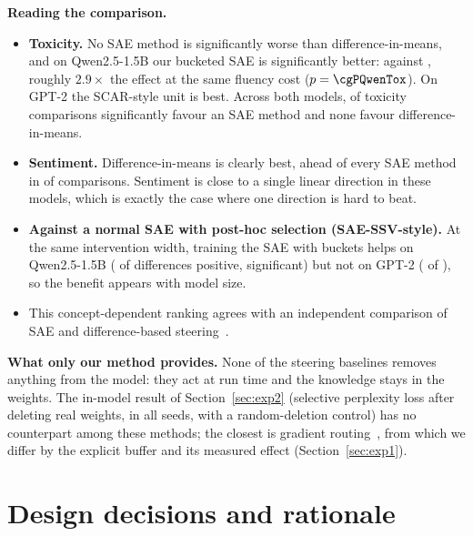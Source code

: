 \documentclass[11pt,a4paper]{article}
\theoremstyle{definition}
\begin{document}
\textbf{Reading the comparison.}
\begin{itemize}
  \item \textbf{Toxicity.} No SAE method is significantly worse than difference-in-means, and on
  Qwen2.5-1.5B our bucketed SAE is significantly better: \cgQwenTox{} against \dimQwenTox, roughly
  $2.9\times$ the effect at the same fluency cost ($p=\cgPQwenTox$). On GPT-2 the SCAR-style unit is
  best. Across both models, \dimToxSAEbetter{} of \dimToxTotal{} toxicity comparisons significantly
  favour an SAE method and none favour difference-in-means.
  \item \textbf{Sentiment.} Difference-in-means is clearly best, ahead of every SAE method in
  \dimSentSAEworse{} of \dimSentTotal{} comparisons. Sentiment is close to a single linear direction
  in these models, which is exactly the case where one direction is hard to beat.
  \item \textbf{Against a normal SAE with post-hoc selection (SAE-SSV-style).} At the same
  intervention width, training the SAE with buckets helps on Qwen2.5-1.5B (\vsSSVqwenPositive{} of
  \vsSSVqwenTotal{} differences positive, \vsSSVqwenSig{} significant) but not on GPT-2
  (\vsSSVgptSig{} of \vsSSVgptTotal), so the benefit appears with model size.
  \item This concept-dependent ranking agrees with an independent comparison of SAE and
  difference-based steering~\cite{xie2025comparative}.
\end{itemize}

\textbf{What only our method provides.} None of the steering baselines removes anything from the
model: they act at run time and the knowledge stays in the weights. The in-model result of
Section~\ref{sec:exp2} (selective perplexity loss after deleting real weights, in all seeds, with a
random-deletion control) has no counterpart among these methods; the closest is gradient
routing~\cite{cloud2024gradient}, from which we differ by the explicit buffer and its measured
effect (Section~\ref{sec:exp1}).

\section{Design decisions and rationale}
\label{sec:decisions}
\end{document}
